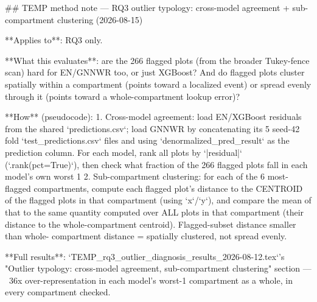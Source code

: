 ## TEMP method note — RQ3 outlier typology: cross-model agreement + sub-compartment clustering (2026-08-15)

**Applies to**: RQ3 only.

**What this evaluates**: are the 266 flagged plots (from the broader Tukey-fence scan) hard for
EN/GNNWR too, or just XGBoost? And do flagged plots cluster spatially within a compartment (points
toward a localized event) or spread evenly through it (points toward a whole-compartment lookup
error)?

**How** (pseudocode):
1. Cross-model agreement: load EN/XGBoost residuals from the shared `predictions.csv`; load GNNWR
   by concatenating its 5 seed-42 fold `test_predictions.csv` files and using `denormalized_pred_result`
   as the prediction column. For each model, rank all plots by `|residual|` (`.rank(pct=True)`), then
   check what fraction of the 266 flagged plots fall in each model's own worst 1%
2. Sub-compartment clustering: for each of the 6 most-flagged compartments, compute each flagged
   plot's distance to the CENTROID of the flagged plots in that compartment (using `x`/`y`), and
   compare the mean of that to the same quantity computed over ALL plots in that compartment (their
   distance to the whole-compartment centroid). Flagged-subset distance smaller than whole-
   compartment distance = spatially clustered, not spread evenly.

**Full results**: `TEMP_rq3_outlier_diagnosis_results_2026-08-12.tex`'s "Outlier typology:
cross-model agreement, sub-compartment clustering" section — ~36x over-representation in each
model's worst-1%
compartment as a whole, in every compartment checked.
